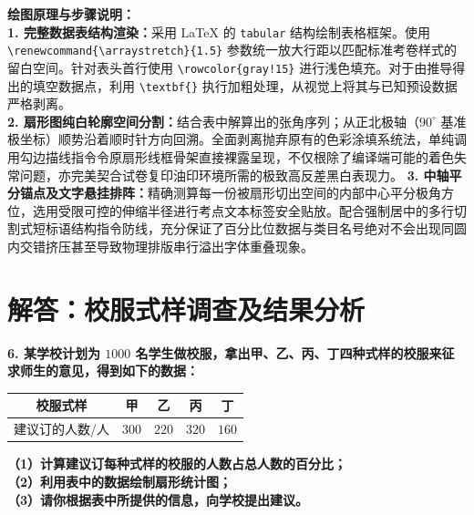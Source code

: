 \vspace{0.6cm}

{\small\color{blue!70!black}
\textbf{绘图原理与步骤说明：}\\
\textbf{1. 完整数据表结构渲染：}采用 LaTeX 的 \texttt{tabular} 结构绘制表格框架。使用 \texttt{\textbackslash renewcommand\{\textbackslash arraystretch\}\{1.5\}} 参数统一放大行距以匹配标准考卷样式的留白空间。针对表头首行使用 \texttt{\textbackslash rowcolor\{gray!15\}} 进行浅色填充。对于由推导得出的填空数据点，利用 \texttt{\textbackslash textbf\{\}} 执行加粗处理，从视觉上将其与已知预设数据严格剥离。\\
\textbf{2. 扇形图纯白轮廓空间分割：}结合表中解算出的张角序列；从正北极轴（$90^\circ$ 基准极坐标）顺势沿着顺时针方向回溯。全面剥离抛弃原有的色彩涂填系统法，单纯调用勾边描线指令令原扇形线框骨架直接裸露呈现，不仅根除了编译端可能的着色失常问题，亦完美契合试卷复印油印环境所需的极致高反差黑白表现力。
\textbf{3. 中轴平分锚点及文字悬挂排阵：}精确测算每一份被扇形切出空间的内部中心平分极角方位，选用受限可控的伸缩半径进行考点文本标签安全贴放。配合强制居中的多行切割式短标语结构指令防线，充分保证了百分比位数据与类目名号绝对不会出现同圆内交错挤压甚至导致物理排版串行溢出字体重叠现象。
}

\newpage



\section{解答：校服式样调查及结果分析}

\vspace{0.6cm}

\textbf{6. 某学校计划为 $1000$ 名学生做校服，拿出甲、乙、丙、丁四种式样的校服来征求师生的意见，得到如下的数据：}

\vspace{0.2cm}
\begin{center}
\renewcommand{\arraystretch}{1.5}
\begin{tabular}{|c|c|c|c|c|}
  \hline
  \rowcolor{gray!15} 
  校服式样 & 甲 & 乙 & 丙 & 丁 \\
  \hline
  建议订的人数/人 & $300$ & $220$ & $320$ & $160$ \\
  \hline
\end{tabular}
\end{center}
\vspace{0.2cm}

\textbf{（1）计算建议订每种式样的校服的人数占总人数的百分比；}\\
\textbf{（2）利用表中的数据绘制扇形统计图；}\\
\textbf{（3）请你根据表中所提供的信息，向学校提出建议。}

